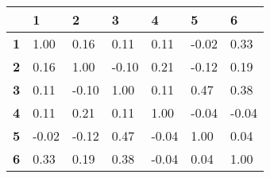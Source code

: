 \begin{tabular}{lllllll}

&\textbf{1}&\textbf{2}&\textbf{3}&\textbf{4}&\textbf{5}&\textbf{6}\\\hline
\textbf{1}&1.00&0.16&0.11&0.11&-0.02&0.33\\
\textbf{2}&0.16&1.00&-0.10&0.21&-0.12&0.19\\
\textbf{3}&0.11&-0.10&1.00&0.11&0.47&0.38\\
\textbf{4}&0.11&0.21&0.11&1.00&-0.04&-0.04\\
\textbf{5}&-0.02&-0.12&0.47&-0.04&1.00&0.04\\
\textbf{6}&0.33&0.19&0.38&-0.04&0.04&1.00\\
\end{tabular}
